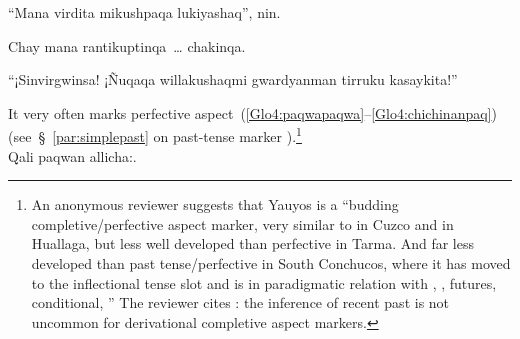 %
{“Mana virdita mikushpaqa lukiyashaq”, nin.}%
{}%
{}{}%

%
{Chay mana rantikuptinqa~\dots{} chakinqa.}%
{}%
{}{}%

%
{“¡Sinvirgwinsa! ¡Ñuqaqa willakushaqmi gwardyanman tirruku kasaykita!”}%
{}%
{}{}%

\noindent
It very often marks perfective aspect~(\ref{Glo4:paqwapaqwa}--\ref{Glo4:chichinanpaq}) (see~§~\ref{par:simplepast} on past-tense marker ).\footnote{An anonymous reviewer suggests that Yauyos  is a “budding completive/perfective aspect marker, very similar to  in Cuzco and in Huallaga, but less well developed than perfective  in Tarma. And far less developed than past tense/perfective  in South Conchucos, where it has moved to the inflectional tense slot and is in paradigmatic relation with , , futures, conditional, \etc” The reviewer cites \citet{bybee1994}: the inference of recent past is not uncommon for derivational completive aspect markers.}\\

%
{Qali paqwan allicha:.}%
{}%
{}{}%

